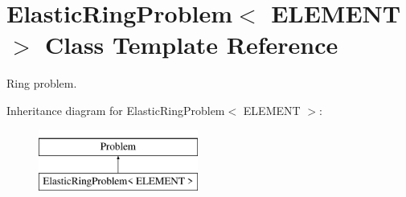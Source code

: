 \hypertarget{classElasticRingProblem}{}\section{Elastic\+Ring\+Problem$<$ E\+L\+E\+M\+E\+NT $>$ Class Template Reference}
\label{classElasticRingProblem}


Ring problem.  


Inheritance diagram for Elastic\+Ring\+Problem$<$ E\+L\+E\+M\+E\+NT $>$\+:\begin{figure}[H]
\begin{center}
\leavevmode
\includegraphics[height=2.000000cm]{classElasticRingProblem}
\end{center}
\end{figure}
